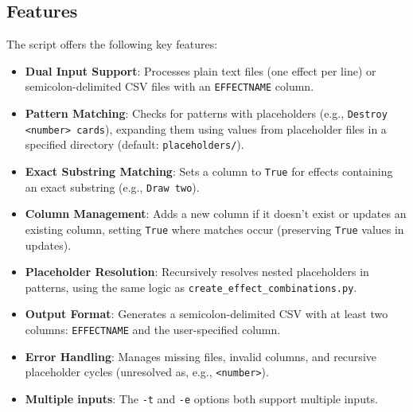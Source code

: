 \subsection{Features}
The script offers the following key features:
\begin{itemize}
    \item \textbf{Dual Input Support}: Processes plain text files (one effect per line) or semicolon-delimited CSV files with an \texttt{EFFECTNAME} column.
    \item \textbf{Pattern Matching}: Checks for patterns with placeholders (e.g., \texttt{Destroy <number> cards}), expanding them using values from placeholder files in a specified directory (default: \texttt{placeholders/}).
    \item \textbf{Exact Substring Matching}: Sets a column to \texttt{True} for effects containing an exact substring (e.g., \texttt{Draw two}).
    \item \textbf{Column Management}: Adds a new column if it doesn’t exist or updates an existing column, setting \texttt{True} where matches occur (preserving \texttt{True} values in updates).
    \item \textbf{Placeholder Resolution}: Recursively resolves nested placeholders in patterns, using the same logic as \texttt{create\_effect\_combinations.py}.
    \item \textbf{Output Format}: Generates a semicolon-delimited CSV with at least two columns: \texttt{EFFECTNAME} and the user-specified column.
    \item \textbf{Error Handling}: Manages missing files, invalid columns, and recursive placeholder cycles (unresolved as, e.g., \texttt{<number>}).
    \item \textbf{Multiple inputs}: The \texttt{-t} and \texttt{-e} options both support multiple inputs.
\end{itemize}

